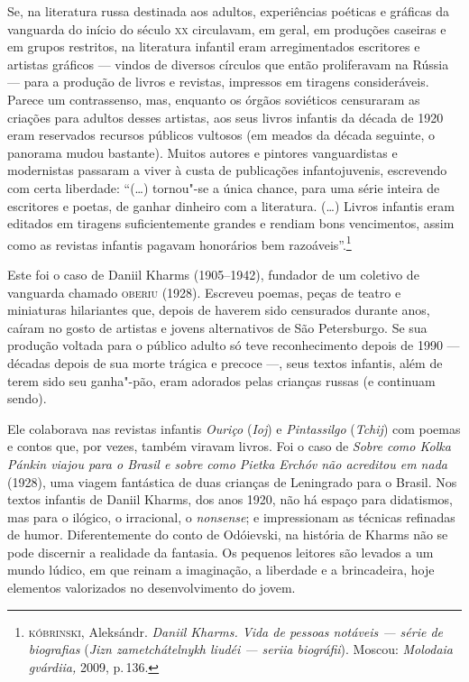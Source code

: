 Se, na literatura russa destinada aos adultos, experiências poéticas e
gráficas da vanguarda do início do século \textsc{xx} circulavam, em geral, em
produções caseiras e em grupos restritos, na literatura infantil eram
arregimentados escritores e artistas gráficos --- vindos de diversos
círculos que então proliferavam na Rússia --- para a produção de livros
e revistas, impressos em tiragens consideráveis. Parece um contrassenso,
mas, enquanto os órgãos soviéticos censuraram as criações para adultos
desses artistas, aos seus livros infantis da década de 1920 eram
reservados recursos públicos vultosos (em meados da década seguinte, o
panorama mudou bastante). Muitos autores e pintores vanguardistas e
modernistas passaram a viver à custa de publicações infantojuvenis,
escrevendo com certa liberdade: ``(\ldots) tornou"-se a única chance, para
uma série inteira de escritores e poetas, de ganhar dinheiro com a
literatura. (\ldots) Livros infantis eram editados em tiragens
suficientemente grandes e rendiam bons vencimentos, assim como as
revistas infantis pagavam honorários bem razoáveis''.\footnote{\textsc{kóbrinski},
  Aleksándr. \emph{Daniil Kharms. Vida de pessoas notáveis --- série de
  biografias} (\emph{Jizn zametchátelnykh liudéi --- seriia
  biográfii}). Moscou: \emph{Molodaia gvárdiia,} 2009, p.\,136.}

Este foi o caso de Daniil Kharms (1905--1942), fundador de um coletivo
de vanguarda chamado \textsc{oberiu} (1928). Escreveu poemas, peças de teatro e
miniaturas hilariantes que, depois de haverem sido censurados durante
anos, caíram no gosto de artistas e jovens alternativos de São
Petersburgo. Se sua produção voltada para o público adulto só teve
reconhecimento depois de 1990 --- décadas depois de sua morte trágica e
precoce ---, seus textos infantis, além de terem sido seu ganha"-pão,
eram adorados pelas crianças russas (e continuam sendo).

Ele colaborava nas revistas infantis \emph{Ouriço} (\emph{Ioj}) e
\emph{Pintassilgo} (\emph{Tchij}) com poemas e contos que, por vezes,
também viravam livros. Foi o caso de \emph{Sobre como Kolka Pánkin
viajou para o Brasil e sobre como Pietka Erchóv não acreditou em nada}
(1928), uma viagem fantástica de duas crianças de Leningrado para o
Brasil. Nos textos infantis de Daniil Kharms, dos anos 1920, não há
espaço para didatismos, mas para o ilógico, o irracional, o
\emph{nonsense}; e impressionam as técnicas refinadas de humor.
Diferentemente do conto de Odóievski, na história de Kharms não se pode
discernir a realidade da fantasia. Os pequenos leitores são levados a um
mundo lúdico, em que reinam a imaginação, a liberdade e a brincadeira,
hoje elementos valorizados no desenvolvimento do jovem.


